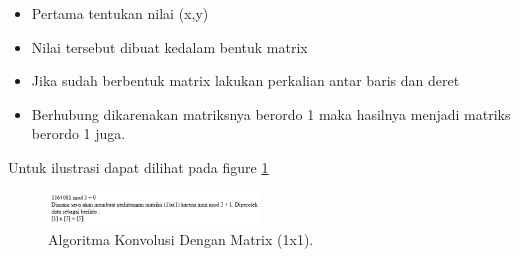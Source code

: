 \begin{enumerate}
	\begin{itemize}
		\item Pertama tentukan nilai (x,y)
		\item Nilai tersebut dibuat kedalam bentuk matrix
		\item Jika sudah berbentuk matrix lakukan perkalian antar baris dan deret
		\item Berhubung dikarenakan matriksnya berordo 1 maka hasilnya menjadi matriks berordo 1 juga.
	\end{itemize}

	\subitem Untuk ilustrasi dapat dilihat pada figure \ref{8}

	\begin{figure}[!htbp!]
		\centerline{\includegraphics[width=0.5\textwidth]{figures/zulfikar/7/Teori/1164081_8.png}}
		\caption{Algoritma Konvolusi Dengan Matrix (1x1).}
		\label{8}
	\end{figure}	



\end{enumerate}